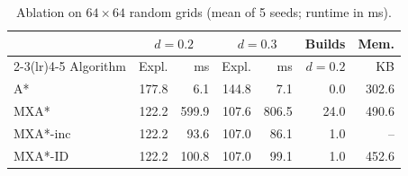 \begin{table}[t]
\centering
\caption{Ablation on $64\times64$ random grids (mean of 5 seeds; runtime in ms).}
\label{tab:ablation}
\small
\begin{tabular}{lrrrrrr}
\toprule
& \multicolumn{2}{c}{$d=0.2$} & \multicolumn{2}{c}{$d=0.3$} & Builds & Mem. \\
\cmidrule(lr){2-3}\cmidrule(lr){4-5}
Algorithm & Expl. & ms & Expl. & ms & $d=0.2$ & KB \\
\midrule
A* & 177.8 & 6.1 & 144.8 & 7.1 & 0.0 & 302.6 \\
MXA* & 122.2 & 599.9 & 107.6 & 806.5 & 24.0 & 490.6 \\
MXA*-inc & 122.2 & 93.6 & 107.0 & 86.1 & 1.0 & -- \\
MXA*-ID & 122.2 & 100.8 & 107.0 & 99.1 & 1.0 & 452.6 \\
\bottomrule
\end{tabular}
\end{table}
